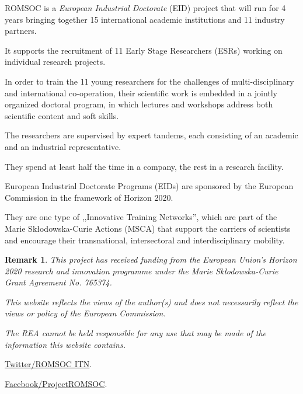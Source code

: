 \documentclass[onsided]{book}
\numberwithin{equation}{section}
\newtheorem{remark}{Remark}[section]
\begin{document}
%
ROMSOC is a \textit{European Industrial Doctorate} (EID) project that will run for 4 years bringing together 15 international academic institutions and 11 industry partners.

It supports the recruitment of 11 Early Stage Researchers (ESRs) working on individual research projects.

In order to train the 11 young researchers for the challenges of multi-disciplinary and international co-operation, their scientific work is embedded in a jointly organized doctoral program, in which lectures and workshops address both scientific content and soft skills.

The researchers are supervised by expert tandems, each consisting of an academic and an industrial representative.

They spend at least half the time in a company, the rest in a research facility.

%
European Industrial Doctorate Programs (EIDs) are sponsored by the European Commission in the framework of Horizon 2020.

They are one type of ,,Innovative Training Networks'', which are part of the Marie Skłodowska-Curie Actions (MSCA) that support the carriers of scientists and encourage their transnational, intersectoral and interdisciplinary mobility.

\begin{remark}
    This project has received funding from the European Union's Horizon 2020 research and innovation programme under the Marie Skłodowska-Curie Grant Agreement No. 765374.
    
    This website reflects the views of the author(s) and does not necessarily reflect the views or policy of the European Commission.
    
    The REA cannot be held responsible for any use that may be made of the information this website contains.
\end{remark}
\href{https://twitter.com/ROMSOC_ITN}{Twitter/ROMSOC ITN}.

\href{https://www.facebook.com/ProjectROMSOC}{Facebook/ProjectROMSOC}.
\end{document}
